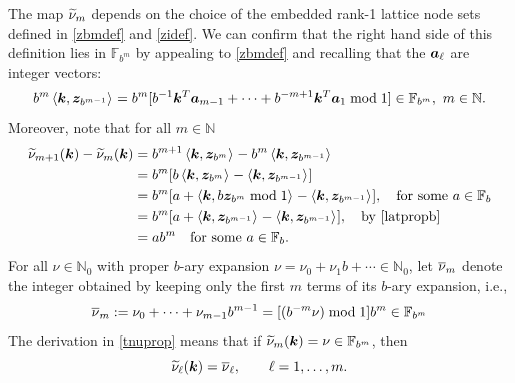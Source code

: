 \documentclass[graybox]{svmult}
\newcommand{\N}{\mathbb{N}} %
\newcommand{\F}{\mathbb{F}} %
\newcommand{\bsz}{\boldsymbol{z}}    %
\begin{document}
The map $\widetilde{\nu}_m$ depends on the choice of the embedded rank-1 lattice node sets defined in \eqref{zbmdef} and \eqref{zidef}.  We can confirm that the right hand side of this definition lies in $\F_{b^m}$ by appealing to  \eqref{zbmdef} and recalling that the $\boldsymbol{a}_\ell$ are integer vectors:
\[
b^{m} \ip{\bsk}{\bsz_{b^{m-1}}} = b^m[b^{-1} \bsk^T\bsa_{m-1} + \cdots + b^{-m+1}\bsk^T \bsa_{1} \bmod 1] \in \F_{b^m}, \ m \in \N.
\]
Moreover, note that for all $m\in \N$
\begin{align}
\label{tnuprop}
\nonumber
\tnu_{m+1}(\bsk) - \tnu_{m}(\bsk) & = b^{m+1} \ip{\bsk}{\bsz_{b^{m}}} - b^{m} \ip{\bsk}{\bsz_{b^{m-1}}} \\
\nonumber
&=b^{m}[ b\ip{\bsk}{\bsz_{b^{m}}} - \ip{\bsk}{\bsz_{b^{m-1}}}]\\
\nonumber
&=b^{m}[ a + \ip{\bsk}{b\bsz_{b^{m}} \bmod 1}  - \ip{\bsk}{\bsz_{b^{m-1}}}], \quad \text{for some }a \in \F_b \\
\nonumber
&=b^{m}[ a + \ip{\bsk}{\bsz_{b^{m-1}}}  - \ip{\bsk}{\bsz_{b^{m-1}}}], \quad  \text{by \eqref{latpropb}} \\
&=a b^{m} \quad \text{for some }a \in \F_b.
\end{align}
For all $\nu\in \N_0$ with proper $b$-ary expansion $\nu= \nu_0 + \nu_1 b + \cdots \in \N_0$, let $\overline{\nu}_{m}$ denote the integer obtained by keeping only the first $m$ terms of its $b$-ary expansion, i.e., 
\begin{equation}
\label{onudef}
\onu_{m} := \nu_0 + \cdots + \nu_{m-1}b^{m-1} = [(b^{-m} \nu) \bmod 1] b^{m} \in \F_{b^{m}}
\end{equation}
The derivation in \eqref{tnuprop} means that if $\tnu_{m}(\bsk) = \nu \in \F_{b^m}$, then
\[
\widetilde{\nu}_\ell(\boldsymbol{k})=\overline{\nu}_{\ell}, \qquad \ell=1, \ldots, m.
\] 
\end{document}
